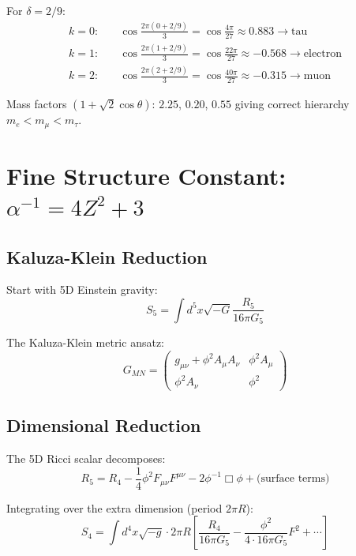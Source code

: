 \documentclass[12pt,a4paper]{article}
\theoremstyle{definition}
\theoremstyle{remark}
\begin{document}
For $\delta = 2/9$:
\begin{align}
k=0: \quad &\cos\frac{2\pi(0 + 2/9)}{3} = \cos\frac{4\pi}{27} \approx 0.883 \to \text{tau} \\
k=1: \quad &\cos\frac{2\pi(1 + 2/9)}{3} = \cos\frac{22\pi}{27} \approx -0.568 \to \text{electron} \\
k=2: \quad &\cos\frac{2\pi(2 + 2/9)}{3} = \cos\frac{40\pi}{27} \approx -0.315 \to \text{muon}
\end{align}

Mass factors $(1 + \sqrt{2}\cos\theta)$: $2.25$, $0.20$, $0.55$ giving correct hierarchy $m_e < m_\mu < m_\tau$.

\section{Fine Structure Constant: $\alpha^{-1} = 4Z^2 + 3$}
\label{sec:alpha}

\subsection{Kaluza-Klein Reduction}

Start with 5D Einstein gravity:
\begin{equation}
S_5 = \int d^5x \sqrt{-G} \frac{R_5}{16\pi G_5}
\end{equation}

The Kaluza-Klein metric ansatz:
\begin{equation}
G_{MN} = \begin{pmatrix} g_{\mu\nu} + \phi^2 A_\mu A_\nu & \phi^2 A_\mu \\ \phi^2 A_\nu & \phi^2 \end{pmatrix}
\end{equation}

\subsection{Dimensional Reduction}

The 5D Ricci scalar decomposes:
\begin{equation}
R_5 = R_4 - \frac{1}{4}\phi^2 F_{\mu\nu}F^{\mu\nu} - 2\phi^{-1}\Box\phi + \text{(surface terms)}
\end{equation}

Integrating over the extra dimension (period $2\pi R$):
\begin{equation}
S_4 = \int d^4x \sqrt{-g} \cdot 2\pi R \left[\frac{R_4}{16\pi G_5} - \frac{\phi^2}{4 \cdot 16\pi G_5} F^2 + \cdots\right]
\end{equation}
\end{document}
